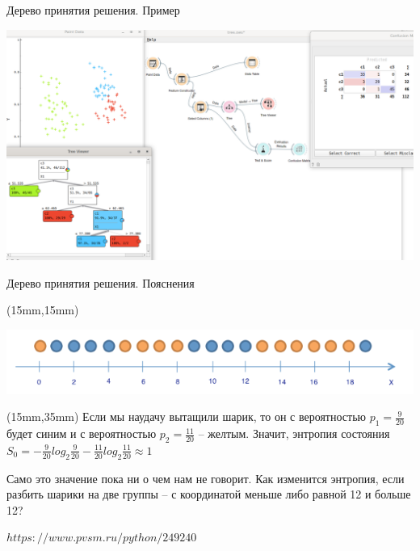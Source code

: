 \documentclass{beamer}
\begin{document}
\begin{frame}{Дерево принятия решения. Пример}


\includegraphics[scale=0.2]{task08_01.png}

\end{frame}


\begin{frame}{Дерево принятия решения. Пояснения}


\begin{textblock*}{120mm}(15mm,15mm)
 

\includegraphics[scale=0.4]{ris_02.png}

\end{textblock*} 


\begin{textblock*}{90mm}(15mm,35mm)
Если мы наудачу вытащили шарик, 
то он с вероятностью $ p_1=\frac{9}{20} $ будет синим и с вероятностью $ p_2=\frac{11}{20} $ – желтым. 
Значит, энтропия состояния  $S_0=-\frac{9}{20}log_2{\frac{9}{20}}-\frac{11}{20}log_2{\frac{11}{20}} \approx 1$

Само это значение пока ни о чем нам не говорит. 
Как изменится энтропия, если разбить шарики на две группы – с координатой меньше либо равной 12 и больше 12?

$https://www.pvsm.ru/python/249240$
\end{textblock*} 


\end{frame}
\end{document}
